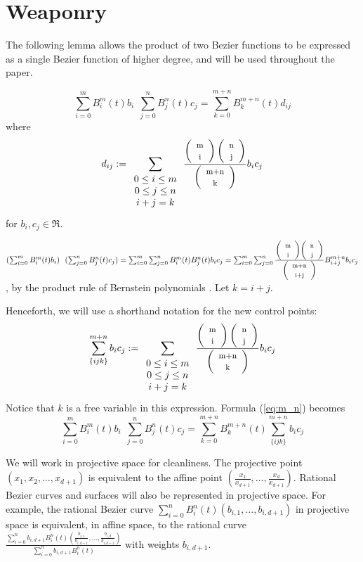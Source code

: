 \section{Weaponry}

The following lemma allows the product of two Bezier functions to be
expressed as a single Bezier function of higher degree, and will be
used throughout the paper.

\begin{lemma}
\label{lem:product}
\begin{equation}
\label{eq:m_n}
\sum_{i=0}^{m} B_i^m(t) b_i \ \ \sum_{j=0}^{n} B_j^n(t) c_j
= \sum_{k=0}^{m+n} B_k^{m+n}(t) d_{ij}
\end{equation}
where
\[
d_{ij} := \sum_{\begin{array}{c} 0 \leq i \leq m \\ 
			     0 \leq j \leq n \\ 
			     i+j=k
			     \end{array}}
	\frac{\left( \begin{array}{c} \mbox{\footnotesize{m}} \\ \mbox{\footnotesize{i}} \end{array} \right) \left( \begin{array}{c} \mbox{\footnotesize{n}} \\ \mbox{\footnotesize{j}} \end{array} \right)}{\left( \begin{array}{c} \mbox{\footnotesize{m+n}} \\ \mbox{\footnotesize{k}} \end{array} \right)}  b_i c_j
\]
for $b_i,c_j \in \Re$.
\end{lemma}
\prf
$(\sum_{i=0}^{m} B_i^m(t) b_i) \ \ (\sum_{j=0}^{n} B_j^n(t) c_j)
= \sum_{i=0}^{m} \sum_{j=0}^{n} B_i^m(t) B_j^n(t) b_i c_j
= \sum_{i=0}^{m} \sum_{j=0}^{n} 
	\frac{\choice{m}{i} \choice{n}{j}}{\choice{m+n}{i+j}}
	B_{i+j}^{m+n} b_i c_j$,
by the product rule of Bernstein polynomials \cite{farin93}.
Let $k=i+j$.
\QED

Henceforth, we will use a shorthand notation for the new control points:
\begin{equation}
\sum_{\{ijk\}}^{m+n} b_i c_j := 
\sum_{\begin{array}{c} 0 \leq i \leq m \\ 
		     0 \leq j \leq n \\ 
		     i+j=k
		     \end{array}}
\frac{\left( \begin{array}{c} \mbox{\footnotesize{m}} \\ \mbox{\footnotesize{i}} \end{array} \right) \left( \begin{array}{c} \mbox{\footnotesize{n}} \\ \mbox{\footnotesize{j}} \end{array} \right)}{\left( \begin{array}{c} \mbox{\footnotesize{m+n}} \\ \mbox{\footnotesize{k}} \end{array} \right)} b_i c_j
\end{equation}
Notice that $k$ is a free variable in this expression.
Formula (\ref{eq:m_n}) becomes
\begin{equation}
\sum_{i=0}^{m} B_i^m(t) b_i \ \ \sum_{j=0}^{n} B_j^n(t) c_j
= \sum_{k=0}^{m+n} B_k^{m+n}(t) \sum_{\{ijk\}}^{m+n} b_i c_j
\end{equation}

We will work in projective space for cleanliness.
The projective point $(x_1,x_2,\ldots,x_{d+1})$ is equivalent
to the affine point $(\frac{x_1}{x_{d+1}},\ldots,\frac{x_d}{x_{d+1}})$.
Rational Bezier curves and surfaces will also be represented in projective
space.
For example, the rational Bezier curve 
$\sum_{i=0}^{n} B_i^n(t) (b_{i,1},\ldots,b_{i,d+1})$ in projective space is
equivalent, in affine space, to the rational curve 
$\frac{\sum_{i=0}^{n} b_{i,d+1} B_i^n(t) 
	(\frac{b_{i,1}}{b_{i,d+1}},\ldots,\frac{b_{i,d}}{b_{i,d+1}})}
      {\sum_{i=0}^{n} b_{i,d+1} B_i^n(t)}$
with weights $b_{i,d+1}$.

